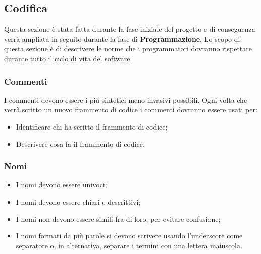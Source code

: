 \subsection{Codifica}

Questa sezione è stata fatta durante la fase iniziale del progetto e di conseguenza verrà ampliata in seguito durante la fase di \textbf{Programmazione}.
Lo scopo di questa sezione è di descrivere le norme che i programmatori dovranno rispettare durante tutto il ciclo di vita del software. 

\subsubsection{Commenti}
I commenti devono essere i più sintetici meno invasivi possibili.
Ogni volta che verrà scritto un nuovo frammento di codice i commenti dovranno essere usati per:
\begin{itemize}
\item Identificare chi ha scritto il frammento di codice;
\item Descrivere cosa fa il frammento di codice.
\end{itemize}

\subsubsection{Nomi}
\begin{itemize}
\item I nomi devono essere univoci;
\item I nomi devono essere chiari e descrittivi;
\item I nomi non devono essere simili fra di loro, per evitare confusione;
\item I nomi formati da più parole si devono scrivere usando l'underscore come separatore o, in alternativa, separare i termini con una lettera maiuscola.
\end{itemize}

